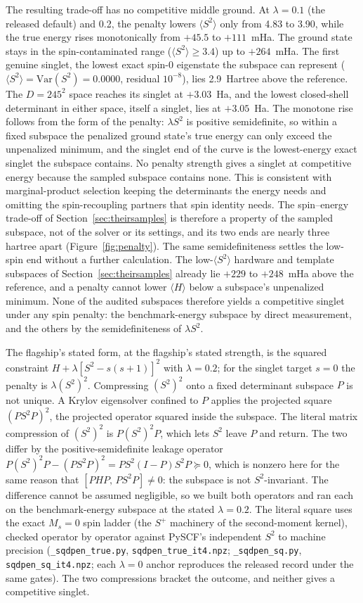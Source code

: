 \documentclass[11pt]{article}
\newcommand{\ssq}{\ensuremath{\langle S^2\rangle}}
\begin{document}
The resulting trade-off has no competitive middle ground. At $\lambda = 0.1$ (the released default) and 0.2, the penalty lowers \ssq{} only from 4.83 to 3.90, while the true energy rises monotonically from $+45.5$ to $+111$~mHa. The ground state stays in the spin-contaminated range ($\ssq \geq 3.4$) up to $+264$~mHa. The first genuine singlet, the lowest exact spin-0 eigenstate the subspace can represent ($\ssq = \mathrm{Var}(S^2) = 0.0000$, residual $10^{-8}$), lies 2.9~Hartree above the reference. The $D = 245^2$ space reaches its singlet at $+3.03$~Ha, and the lowest closed-shell determinant in either space, itself a singlet, lies at $+3.05$~Ha. The monotone rise follows from the form of the penalty: $\lambda S^2$ is positive semidefinite, so within a fixed subspace the penalized ground state's true energy can only exceed the unpenalized minimum, and the singlet end of the curve is the lowest-energy exact singlet the subspace contains. No penalty strength gives a singlet at competitive energy because the sampled subspace contains none. This is consistent with marginal-product selection keeping the determinants the energy needs and omitting the spin-recoupling partners that spin identity needs. The spin--energy trade-off of Section~\ref{sec:theirsamples} is therefore a property of the sampled subspace, not of the solver or its settings, and its two ends are nearly three hartree apart (Figure~\ref{fig:penalty}). The same semidefiniteness settles the low-spin end without a further calculation. The low-\ssq{} hardware and template subspaces of Section~\ref{sec:theirsamples} already lie $+229$ to $+248$~mHa above the reference, and a penalty cannot lower $\langle H\rangle$ below a subspace's unpenalized minimum. None of the audited subspaces therefore yields a competitive singlet under any spin penalty: the benchmark-energy subspace by direct measurement, and the others by the semidefiniteness of $\lambda S^2$.

The flagship's stated form, at the flagship's stated strength, is the squared constraint $H+\lambda[S^2-s(s+1)]^2$ with $\lambda=0.2$; for the singlet target $s=0$ the penalty is $\lambda(S^2)^2$. Compressing $(S^2)^2$ onto a fixed determinant subspace $P$ is not unique. A Krylov eigensolver confined to $P$ applies the projected square $(PS^2P)^2$, the projected operator squared inside the subspace. The literal matrix compression of $(S^2)^2$ is $P(S^2)^2P$, which lets $S^2$ leave $P$ and return. The two differ by the positive-semidefinite leakage operator $P(S^2)^2P - (PS^2P)^2 = PS^2(I-P)S^2P \succeq 0$, which is nonzero here for the same reason that $[PHP,\, PS^2P] \neq 0$: the subspace is not $S^2$-invariant. The difference cannot be assumed negligible, so we built both operators and ran each on the benchmark-energy subspace at the stated $\lambda=0.2$. The literal square uses the exact $M_s=0$ spin ladder (the $S^+$ machinery of the second-moment kernel), checked operator by operator against PySCF's independent $S^2$ to machine precision (\texttt{\_sqdpen\_true.py}, \texttt{sqdpen\_true\_it4.npz}; \texttt{\_sqdpen\_sq.py}, \texttt{sqdpen\_sq\_it4.npz}; each $\lambda=0$ anchor reproduces the released record under the same gates). The two compressions bracket the outcome, and neither gives a competitive singlet.
\end{document}
